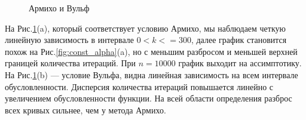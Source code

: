 \documentclass{article}
\begin{document}
	\newpage
	\begin{figure}[H]
		\centering
		\hfill %
		\caption{Армихо и Вульф}
		\label{fig:armijo_wolfe}
	\end{figure}
	
	На Рис.\ref{fig:armijo_wolfe}(a), который соответствует условию Армихо, мы наблюдаем четкую линейную зависимость в интервале $0 < k <= 300$, далее график становится похож на Рис.\ref{fig:const_alpha}(a), но с меньшим разбросом и меньшей верхней границей количества итераций. При $n = 10000$ график выходит на ассимптотику. На Рис.\ref{fig:armijo_wolfe}(b) --- условие Вульфа, видна линейная зависимость на всем интервале обусловленности. Дисперсия количества итераций повышается линейно с увеличением обусловленности функции. На всей области определения разброс всех кривых сильнее, чем у метода Армихо.
	
	
	
	
	
	
	
	
	
	
	
	
	
	
	
	
\end{document}
